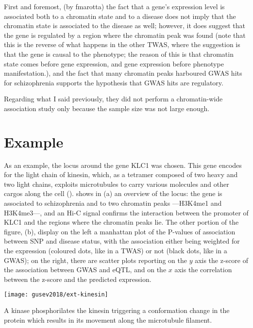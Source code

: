\documentclass[../main.tex]{subfiles}
\begin{document}
First and foremost, (by fmarotta) the fact that a gene's expression 
level is associated both to a chromatin state and to a disease does not 
imply that the chromatin state is associated to the disease as well; 
however, it does suggest that the gene is regulated by a region where 
the chromatin peak was found (note that this is the reverse of what 
happens in the other TWAS, where the suggestion is that the gene is 
causal to the phenotype; the reason of this is that chromatin state 
comes before gene expression, and gene expression before phenotype 
manifestation.), and the fact that many chromatin peaks harboured GWAS 
hits for schizophrenia supports the hypothesis that GWAS hits are 
regulatory.

Regarding what I said previously, they did not perform a chromatin-wide 
association study only because the sample size was not large enough.

\section{Example}

As an example, the locus around the gene KLC1 was chosen. This gene 
encodes for the light chain of kinesin, which, as a tetramer composed of 
two heavy and two light chains, exploits microtubules to carry various 
molecules and other cargos along the cell (). 
 shows in (a) an overview of the locus: the gene is 
associated to schizophrenia and to two chromatin peaks ---H3K4me1 and 
H3K4me3---, and an Hi-C signal confirms the interaction between the 
promoter of KLC1 and the regions where the chromatin peaks lie. The 
other portion of the figure, (b), display on the left a manhattan plot 
of the P-values of association between SNP and disease status, with the 
association either being weighted for the expression (coloured dots, 
like in a TWAS) or not (black dots, like in a GWAS); on the right, there 
are scatter plots reporting on the $y$ axis the z-score of the 
association between GWAS and eQTL, and on the $x$ axis the correlation 
between the z-score and the predicted expression.

\begin{marginfigure}[-8cm]
	\texttt{[image: gusev2018/ext-kinesin]}
	\caption{A kinase phosphorilates the kinesin triggering a 
conformation change in the protein which results in its movement along 
the microtubule filament.}
\end{marginfigure}
\end{document}
